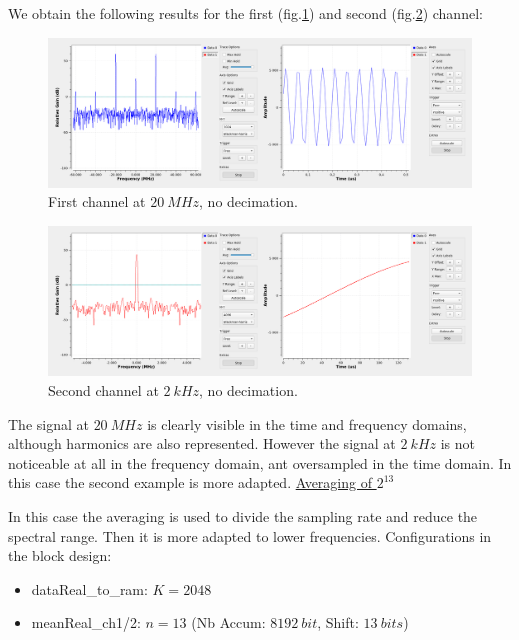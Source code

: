 \documentclass[12pt,oneside]{article}
\begin{document}
We obtain the following results for the first (fig.\ref{fig:gnuNoMoych1}) and second (fig.\ref{fig:gnuNoMoych2}) channel:

\begin{figure}[h!tb]
	\begin{center}
		\includegraphics[width=16cm,trim={0cm 0cm 0cm 0cm}, clip]{scope/gnu/NoMch1.png}
		\caption{First channel at $20~MHz$, no decimation.}
		\label{fig:gnuNoMoych1}
	\end{center}
\end{figure}


\begin{figure}[h!tb]
	\begin{center}
		\includegraphics[width=16cm,trim={0cm 0cm 0cm 0cm}, clip]{scope/gnu/NoMch2.png}
		\caption{Second channel at $2~kHz$, no decimation.}
		\label{fig:gnuNoMoych2}
	\end{center}
\end{figure}


The signal at $20~MHz$ is clearly visible in the time and frequency domains, although harmonics are also represented. However the signal at $2~kHz$ is not noticeable at all in the frequency domain, ant oversampled in the time domain. In this case the second example is more adapted.
\newline\newline
\underline{Averaging of $2^{13}$}\newline

In this case the averaging is used to divide the sampling rate and reduce the spectral range. Then it is more adapted to lower frequencies. Configurations in the block design: 
\begin{itemize}
	\setlength\itemsep{-0.2cm}
	\item dataReal\_to\_ram: $K=2048$
	\item meanReal\_ch1/2: $n=13$ (Nb Accum: $8192~bit$, Shift: $13~bits$)
\end{itemize}
\end{document}
